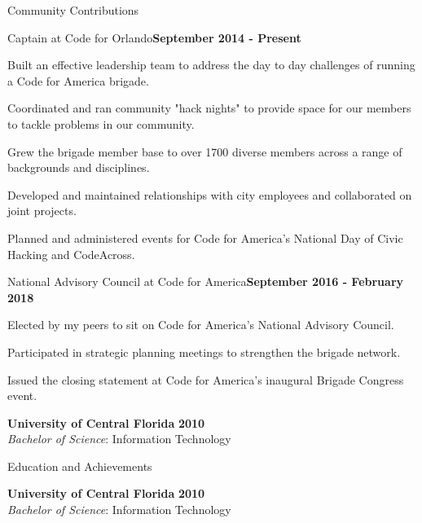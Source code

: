 \documentclass{resume} %
\begin{document}
\begin{rSection}{Community Contributions}

\begin{rSubsection}{Captain at Code for Orlando}{\bf September 2014 - Present}{}{}

\item Built an effective leadership team to address the day to day challenges of running a Code for America brigade.
\item Coordinated and ran community "hack nights" to provide space for our members to tackle problems in our community.
\item Grew the brigade member base to over 1700 diverse members across a range of backgrounds and disciplines.
\item Developed and maintained relationships with city employees and collaborated on joint projects.
\item Planned and administered events for Code for America's National Day of Civic Hacking and CodeAcross.


\end{rSubsection}

\begin{rSubsection}{National Advisory Council at Code for America}{\bf September 2016 - February 2018}{}{}

\item Elected by my peers to sit on Code for America's National Advisory Council.
\item Participated in strategic planning meetings to strengthen the brigade network.
\item Issued the closing statement at Code for America's inaugural Brigade Congress event.


\end{rSubsection}

{\bf University of Central Florida} \hfill {\bf 2010} \\ 
{\it Bachelor of Science}: Information Technology \\
\end{rSection}


\begin{rSection}{Education and Achievements}

{\bf University of Central Florida} \hfill {\bf 2010} \\ 
{\it Bachelor of Science}: Information Technology \\
\end{rSection}
\end{document}
